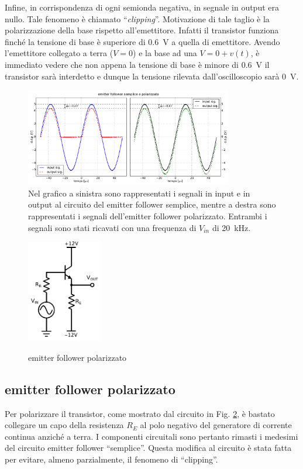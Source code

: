 Infine, in corrispondenza di ogni semionda negativa, in segnale in output era nullo.
Tale fenomeno è chiamato ``\emph{clipping}''. Motivazione di tale taglio è la polarizzazione della base rispetto all'emettitore. Infatti il transistor funziona finché la tensione di base è superiore di \SI{0.6}{\volt} a quella di emettitore. Avendo l'emettitore collegato a terra ($V=0$) e la base ad una $V=0+v(t)$, è immediato vedere che non appena la tensione di base è minore di \SI{0.6}{\volt} il transistor sarà interdetto e dunque la tensione rilevata dall'oscilloscopio sarà \SI{0}{\volt}.

\begin{figure}[H]
\centering
	\includegraphics[width=0.81\textwidth]{cc3+cc4.pdf}
	\caption{Nel grafico a sinistra sono rappresentati i segnali in input e in output al circuito del emitter follower semplice, mentre a destra sono rappresentati i segnali dell'emitter follower polarizzato. Entrambi i segnali sono stati ricavati con una frequenza di $V_{in}$ di \SI{20}{\kilo\hertz}.}
	\label{fig:cc3+cc4}
\end{figure}

\begin{figure}
	\caption{emitter follower polarizzato}
	\includegraphics[height=45mm]{cc4.pdf}
	\label{fig:cc4}
\end{figure}

\subsection{emitter follower polarizzato}
Per polarizzare il transistor, come mostrato dal circuito in Fig. \ref{fig:cc4}, è bastato collegare un capo della resistenza $R_E$ al polo negativo del generatore di corrente continua anziché a terra.
I componenti circuitali sono pertanto rimasti i medesimi del circuito emitter follower ``semplice''.
Questa modifica al circuito è stata fatta per evitare, almeno parzialmente, il fenomeno di ``clipping''.

